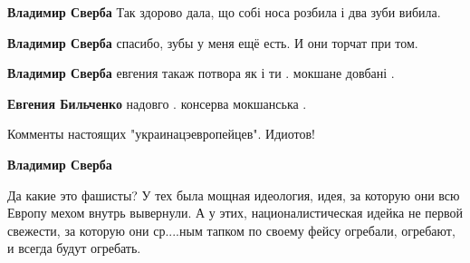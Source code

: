 \begin{itemize}
\begin{itemize}
 
\textbf{Владимир Сверба} Так здорово дала, що собі носа розбила і два зуби вибила.

 
\textbf{Владимир Сверба} спасибо, зубы у меня ещё есть. И они торчат при том.

 
\textbf{Владимир Сверба} евгения такаж потвора як і ти . мокшане довбані .

 
\textbf{Евгения Бильченко} надовго . консерва мокшанська .

 
Комменты настоящих "украинацэевропейцев". Идиотов!

 
\textbf{Владимир Сверба} 

Да какие это фашисты? У тех была мощная идеология, идея, за которую они всю
Европу мехом внутрь вывернули. А у этих, националистическая идейка не первой
свежести, за которую они ср....ным тапком по своему фейсу огребали, огребают, и
всегда будут огребать.


 

\end{itemize}
\end{itemize}
